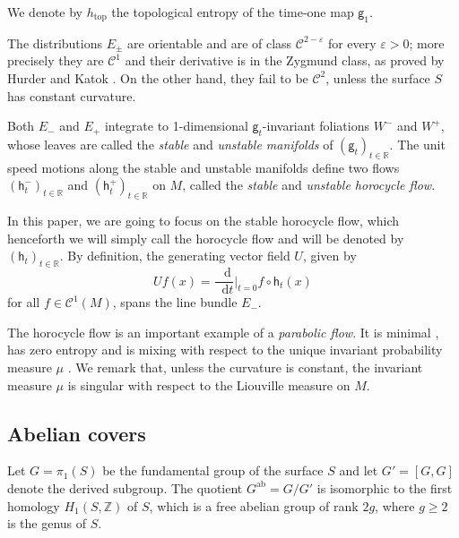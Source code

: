 \documentclass[11pt,letterpaper]{amsart}
\newcommand \R {{ \mathbb R}}
\newcommand \Z {{ \mathbb Z}}
\newcommand{\horo}{\mathsf{h}}
\newcommand{\geo}{\mathsf{g}}
\newcommand*{\diff}{\mathop{}\!\mathrm{d}}
\DeclareMathOperator{\topp}{top}
\DeclareMathOperator{\abel}{ab}
\theoremstyle{definition}
\begin{document}
We denote by $h_{\topp}$ the topological entropy of the time-one map $\geo_1$.

The distributions $E_{\pm}$ are orientable and are of class $\mathscr{C}^{2-\varepsilon}$ for every $\varepsilon >0$; more precisely they are $\mathscr{C}^{1}$ and their derivative is in the Zygmund class, as proved by Hurder and Katok \cite{HuKa}.
On the other hand, they fail to be $\mathscr{C}^{2}$, unless the surface $S$ has constant curvature.

Both $E_{-}$ and $E_{+}$ integrate to 1-dimensional $\geo_t$-invariant foliations $W^{-}$ and $W^{+}$, whose leaves are called the \emph{stable} and \emph{unstable manifolds} of $(\geo_t)_{t \in \R}$. 
The unit speed motions along the stable and unstable manifolds define two flows $(\horo^{-}_t)_{t \in \R}$ and $(\horo^{+}_t)_{t \in \R}$ on $M$, called the \emph{stable} and \emph{unstable horocycle flow}. 

In this paper, we are going to focus on the stable horocycle flow, which henceforth we will simply call the horocycle flow and will be denoted by $(\horo_t)_{t \in \R}$. By definition, the generating vector field $U$, given by
\[
Uf(x) = \frac{\diff}{\diff t} \Big\vert_{t=0} f \circ \horo_t(x)
\]
for all $f\in \mathscr{C}^1(M)$, spans the line bundle $E_{-}$. 

The horocycle flow is an important example of a \emph{parabolic flow}. It is minimal \cite{Bow, Pla}, has zero entropy \cite{Gur} and is mixing with respect to the unique invariant probability measure $\mu$ \cite{Marcus2}. We remark that, unless the curvature is constant, the invariant measure $\mu$ is singular with respect to the Liouville measure on $M$. %


\subsection{Abelian covers}\label{sec:abelian_covers}
Let $G = \pi_1(S)$ be the fundamental group of the surface $S$ and let $G' = [G,G]$ denote the derived subgroup. 
The quotient $G^{\abel} = G/G'$ is isomorphic to the first homology $H_1(S,\Z)$ of $S$, which is a free abelian group of rank $2g$, where $g \geq 2$ is the genus of $S$.
\end{document}
